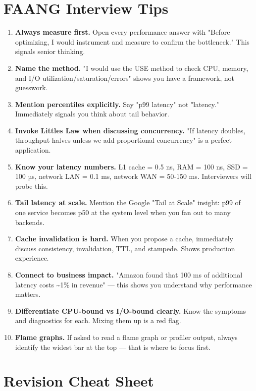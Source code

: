 \documentclass[11pt]{article}
\begin{document}
\section{FAANG Interview Tips}\label{faang-interview-tips}

\begin{enumerate}
\def\labelenumi{\arabic{enumi}.}
\item
  \textbf{Always measure first.} Open every performance answer with "Before optimizing, I would instrument and measure to confirm the bottleneck." This signals senior thinking.
\item
  \textbf{Name the method.} "I would use the USE method to check CPU, memory, and I/O utilization/saturation/errors" shows you have a framework, not guesswork.
\item
  \textbf{Mention percentiles explicitly.} Say "p99 latency" not "latency." Immediately signals you think about tail behavior.
\item
  \textbf{Invoke Little\textquotesingle s Law when discussing concurrency.} "If latency doubles, throughput halves unless we add proportional concurrency" is a perfect application.
\item
  \textbf{Know your latency numbers.} L1 cache = 0.5 ns, RAM = 100 ns, SSD = 100 µs, network LAN = 0.1 ms, network WAN = 50-150 ms. Interviewers will probe this.
\item
  \textbf{Tail latency at scale.} Mention the Google "Tail at Scale" insight: p99 of one service becomes p50 at the system level when you fan out to many backends.
\item
  \textbf{Cache invalidation is hard.} When you propose a cache, immediately discuss consistency, invalidation, TTL, and stampede. Shows production experience.
\item
  \textbf{Connect to business impact.} "Amazon found that 100 ms of additional latency costs \textasciitilde1\% in revenue" --- this shows you understand why performance matters.
\item
  \textbf{Differentiate CPU-bound vs I/O-bound clearly.} Know the symptoms and diagnostics for each. Mixing them up is a red flag.
\item
  \textbf{Flame graphs.} If asked to read a flame graph or profiler output, always identify the widest bar at the top --- that is where to focus first.
\end{enumerate}

\section{Revision Cheat Sheet}\label{revision-cheat-sheet}
\end{document}

